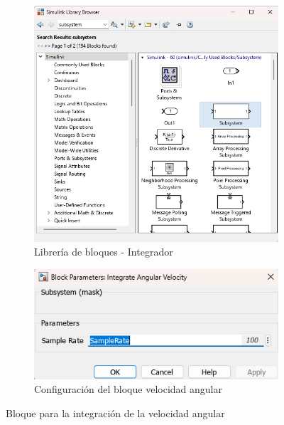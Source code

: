 \begin{figure}[htbp]
    \centering
    \begin{subfigure}[b]{0.35\textwidth}
        \centering
        \includegraphics[width=\textwidth]{fig/Capitulo5/Caso_de_estudio_IMU/Generador_de_archivos/libreria_de_bloques_subsistema_integracion_velocidad_angular.png}
        \caption{Librería de bloques - Integrador}
        \label{fig:lib_bloques_integrador}
    \end{subfigure}
    \hfill
    \begin{subfigure}[b]{0.45\textwidth}
        \centering
        \includegraphics[width=\textwidth]{fig/Capitulo5/Caso_de_estudio_IMU/Generador_de_archivos/configuracion_integrador_velocidad_angular.png}
        \caption{Configuración del bloque velocidad angular}
        \label{fig:config_bloques_integrador}
    \end{subfigure}
    \caption{Bloque para la integración de la velocidad angular}
    \label{fig:integration_for_angular_velocity}
\end{figure}


